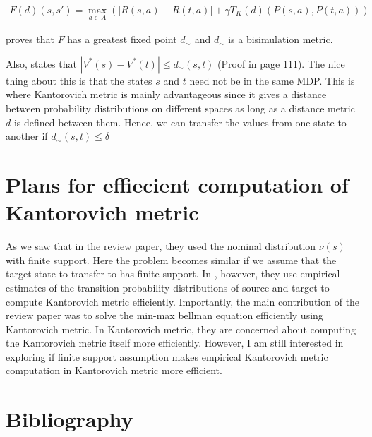 \documentclass{article}[11pt]
\begin{document}
\begin{align*}
F(d)(s,s') = \max_{a\in A}(|R(s,a) - R(t,a)| + \gamma T_K(d)(P(s,a),P(t,a)))
\end{align*}

\cite{ferns2004metrics} proves that $F$ has a greatest fixed point $d_{\sim}$ and $d_{\sim}$ is a bisimulation metric.

Also, \cite{castro2011planning} states that $|V^*(s) - V^*(t)| \le d_{\sim}(s,t)$ (Proof in page 111). The nice thing about this is that the states $s$ and $t$ need not be in the same MDP. This is where  Kantorovich metric is mainly advantageous since it gives a distance between probability distributions on different spaces as long as a distance metric $d$ is defined between them. Hence, we can transfer the values from one state to another if $d_{\sim}(s,t) \le \delta$


\section{Plans for effiecient computation of  Kantorovich metric}
As we saw that in the review paper, they used the nominal distribution $\nu(s)$ with finite support. Here the problem becomes similar if we assume that the target state to transfer to has finite support. In \cite{castro2011planning}, however, they use empirical estimates of the transition probability distributions of source and target to compute Kantorovich metric efficiently. Importantly, the main contribution of the review paper was to solve the min-max bellman equation efficiently using Kantorovich metric. In Kantorovich metric, they are concerned about computing the Kantorovich metric itself more efficiently. However, I am still interested in exploring if finite support assumption makes empirical  Kantorovich metric computation in Kantorovich metric more efficient.


\section{Bibliography}



\end{document}
